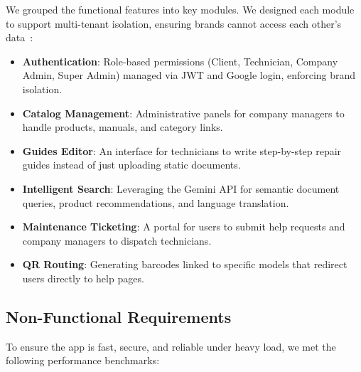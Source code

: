 \documentclass[12pt,a4paper]{report}
\begin{document}
We grouped the functional features into key modules. We designed each module to support multi-tenant isolation, ensuring brands cannot access each other's data~\cite{mongodb_multitenant}:

\begin{itemize}
    \item \textbf{Authentication}: Role-based permissions (Client, Technician, Company Admin, Super Admin) managed via JWT and Google login, enforcing brand isolation.
    \item \textbf{Catalog Management}: Administrative panels for company managers to handle products, manuals, and category links.
    \item \textbf{Guides Editor}: An interface for technicians to write step-by-step repair guides instead of just uploading static documents.
    \item \textbf{Intelligent Search}: Leveraging the Gemini API \cite{gemini} for semantic document queries, product recommendations, and language translation.
    \item \textbf{Maintenance Ticketing}: A portal for users to submit help requests and company managers to dispatch technicians.
    \item \textbf{QR Routing}: Generating barcodes linked to specific models that redirect users directly to help pages.
\end{itemize}

\subsection{Non-Functional Requirements}

To ensure the app is fast, secure, and reliable under heavy load, we met the following performance benchmarks:
\end{document}
